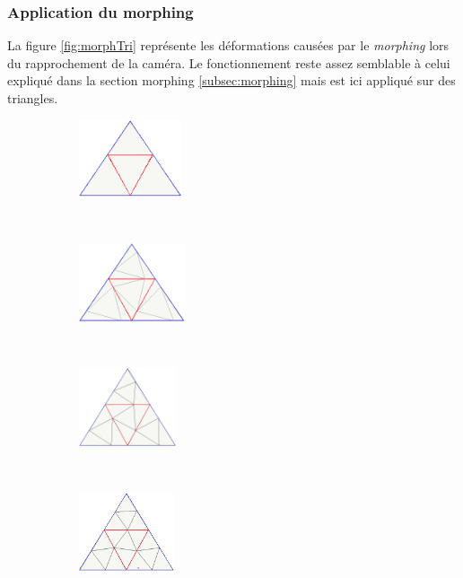 	
  \subsubsection{Application du morphing}
  La figure \ref{fig:morphTri} représente les déformations causées par le \textit{morphing} lors du rapprochement de la caméra. Le fonctionnement reste assez semblable à celui expliqué dans la section morphing \ref{subsec:morphing} mais est ici appliqué sur des triangles.
  	
\begin{figure}[H]
    \centering
    \begin{subfigure}[b]{0.17\textwidth}
       \centering \includegraphics[width=\textwidth,height=2.25cm]{img/morph5.png}
       \caption{}\label{subfig:morph5}
    \end{subfigure}
    ~ 
    \begin{subfigure}[b]{0.17\textwidth}
       \centering \includegraphics[width=\textwidth,height=2.3cm]{img/morph4.png}
       \caption{}\label{subfig:morph4}
    \end{subfigure}
    ~
    \begin{subfigure}[b]{0.17\textwidth}
       \centering \includegraphics[width=\textwidth,height=2.3cm]{img/morph3.png}
       \caption{}\label{subfig:morph3}
    \end{subfigure}
    ~
    \begin{subfigure}[b]{0.16\textwidth}
       \centering \includegraphics[width=\textwidth,height=2.3cm]{img/morph2.png}

\end{subfigure}
\end{figure}

